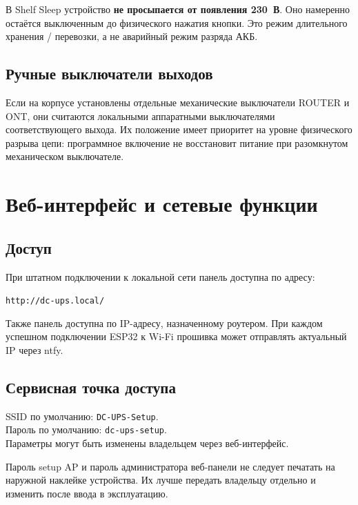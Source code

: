\documentclass[11pt,a4paper]{article}
\begin{document}
\begin{tcolorbox}[colback=lightwarn,colframe=warn,title=Важно: режим хранения]
В Shelf Sleep устройство \textbf{не просыпается от появления 230~В}. Оно намеренно остаётся выключенным до физического нажатия кнопки. Это режим длительного хранения / перевозки, а не аварийный режим разряда АКБ.
\end{tcolorbox}

\subsection{Ручные выключатели выходов}
Если на корпусе установлены отдельные механические выключатели ROUTER и ONT, они считаются локальными аппаратными выключателями соответствующего выхода. Их положение имеет приоритет на уровне физического разрыва цепи: программное включение не восстановит питание при разомкнутом механическом выключателе.

\section{Веб-интерфейс и сетевые функции}

\subsection{Доступ}
При штатном подключении к локальной сети панель доступна по адресу:
\begin{center}
\texttt{http://dc-ups.local/}
\end{center}
Также панель доступна по IP-адресу, назначенному роутером. При каждом успешном подключении ESP32 к Wi-Fi прошивка может отправлять актуальный IP через ntfy.

\subsection{Сервисная точка доступа}
SSID по умолчанию: \texttt{DC-UPS-Setup}.\\
Пароль по умолчанию: \texttt{dc-ups-setup}.\\
Параметры могут быть изменены владельцем через веб-интерфейс.

\begin{tcolorbox}[colback=lightaccent,colframe=accent,title=Рекомендация]
Пароль setup AP и пароль администратора веб-панели не следует печатать на наружной наклейке устройства. Их лучше передать владельцу отдельно и изменить после ввода в эксплуатацию.
\end{tcolorbox}
\end{document}
